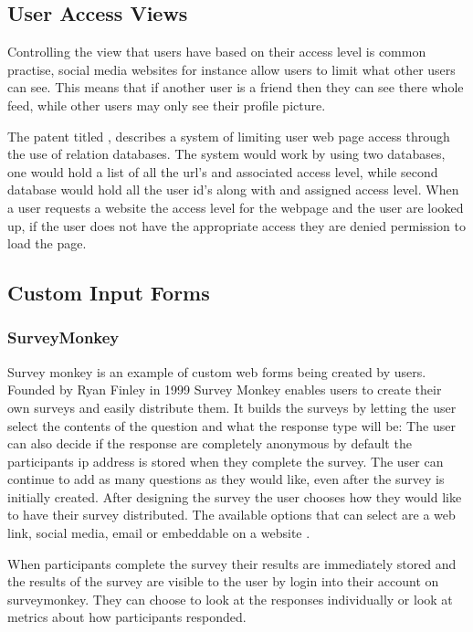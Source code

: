\documentclass[12pt]{article}  %
\begin{document}
\newpage
\subsection{User Access Views}

Controlling the view that users have based on their access level is common practise, social media websites for instance allow users to limit what other users can see. This means that if another user is a friend then they can see there whole feed, while other users may only see their profile picture.

The patent titled  \cite{baker_system_1997}, describes a system of limiting user web page access through the use of relation databases. The system would work by using two databases, one would hold a list of all the url's and associated access level, while second database would hold all the user id's along with and assigned access level. When a user requests a website the access level for the webpage and the user are looked up, if the user does not have the appropriate access they are denied permission to load the page.


\subsection{Custom Input Forms}

\subsubsection{SurveyMonkey}
Survey monkey \cite{finley_surveymonkey_1999} is an example of custom web forms being created by users. Founded by Ryan Finley in 1999 Survey Monkey enables users to create their own surveys and easily distribute them. It builds the surveys by letting the user select the contents of the question and what the response type will be: The user can also decide if the response are completely anonymous by default the participants ip address is stored when they complete the survey. The user can continue to add as many questions as they would like, even after the survey is initially created. After designing the survey the user chooses how they would like to have their survey distributed. The available options that can select are a web link, social media, email or embeddable on a website . 

When participants complete the survey their results are immediately stored and the results of the survey are visible to the user by login into their account on surveymonkey. They can choose to look at the responses individually or look at metrics about how participants responded.
\end{document}
